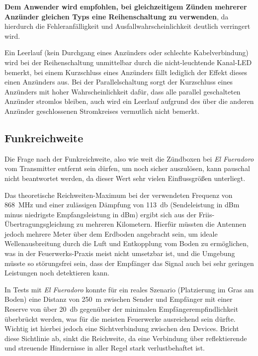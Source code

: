 \documentclass[paper=a4, parskip, numbers=noenddot, toc=listof, headsepline]{scrbook}
\newcommand{\anlage}{\emph{El Fueradoro}}
\begin{document}
			  \textbf{Dem Anwender wird empfohlen, bei gleichzeitigem Zünden mehrerer Anzünder gleichen Typs eine Reihenschaltung zu verwenden}, da hierdurch die Fehleranfälligkeit und Ausfallwahrscheinlichkeit deutlich verringert wird.

			  Ein Leerlauf (kein Durchgang eines Anzünders oder schlechte Kabelverbindung) wird bei der Reihenschaltung unmittelbar durch die nicht-leuchtende Kanal-LED bemerkt, bei einem Kurzschluss eines Anzünders fällt lediglich der Effekt dieses einen Anzünders aus. Bei der Parallelschaltung sorgt der Kurzschluss eines Anzünders mit hoher Wahrscheinlichkeit dafür, dass alle parallel geschalteten Anzünder stromlos bleiben, auch wird ein Leerlauf aufgrund des über die anderen Anzünder geschlossenen Stromkreises vermutlich nicht bemerkt.

		  \subsection{Funkreichweite}

			  Die Frage nach der Funkreichweite, also wie weit die Zündboxen bei {\anlage} vom Transmitter entfernt sein dürfen, um noch sicher auszulösen, kann pauschal nicht beantwortet werden, da dieser Wert sehr vielen Einflussgrößen unterliegt.

			  Das theoretische Reichweiten-Maximum bei der verwendeten Frequenz von \SI{868}{\mega\hertz} und einer zulässigen Dämpfung von \SI{113}{\decibel} (Sendeleistung in dBm minus niedrigste Empfangsleistung in dBm) ergibt sich aus der Friis-Übertragungsgleichung zu mehreren Kilometern. Hierfür müssten die Antennen jedoch mehrere Meter über dem Erdboden angebracht sein, um ideale Wellenausbreitung durch die Luft und Entkopplung vom Boden zu ermöglichen, was in der Feuerwerks-Praxis meist nicht umsetzbar ist, und die Umgebung müsste so störungsfrei sein, dass der Empfänger das Signal auch bei sehr geringen Leistungen noch detektieren kann.

			  In Tests mit {\anlage} konnte für ein reales Szenario (Platzierung im Gras am Boden) eine Distanz von \SI{250}{\meter} zwischen Sender und Empfänger mit einer Reserve von über \SI{20}{\decibel} gegenüber der minimalen Empfänger\-empfindlichkeit überbrückt werden, was für die meisten Feuerwerke ausreichend sein dürfte. Wichtig ist hierbei jedoch eine Sichtverbindung zwischen den Devices. Bricht diese Sichtlinie ab, sinkt die Reichweite, da eine Verbindung über reflektierende und streuende Hindernisse in aller Regel stark verlustbehaftet ist.
\end{document}
